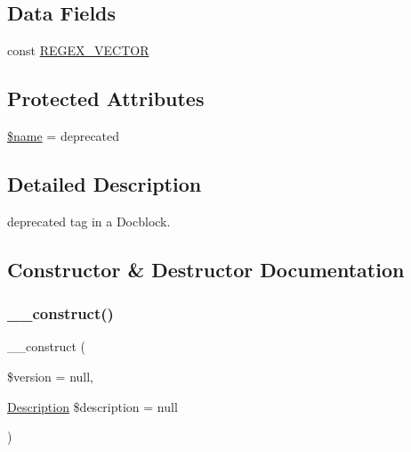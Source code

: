 \subsection*{Data Fields}
\begin{DoxyCompactItemize}
\item 
const \mbox{\hyperlink{classphp_documentor_1_1_reflection_1_1_doc_block_1_1_tags_1_1_deprecated_aec4feb4c31b9abab8a40577d90b872f8}{R\+E\+G\+E\+X\+\_\+\+V\+E\+C\+T\+OR}}
\end{DoxyCompactItemize}
\subsection*{Protected Attributes}
\begin{DoxyCompactItemize}
\item 
\mbox{\hyperlink{classphp_documentor_1_1_reflection_1_1_doc_block_1_1_tags_1_1_deprecated_ab2fc40d43824ea3e1ce5d86dee0d763b}{\$name}} = \textquotesingle{}deprecated\textquotesingle{}
\end{DoxyCompactItemize}


\subsection{Detailed Description}
deprecated tag in a Docblock. 

\subsection{Constructor \& Destructor Documentation}
\mbox{\label{classphp_documentor_1_1_reflection_1_1_doc_block_1_1_tags_1_1_deprecated_a75f67561d733f42ea52230c5b289d264}} 
\subsubsection{\texorpdfstring{\+\_\+\+\_\+construct()}{\_\_construct()}}
{\footnotesize\ttfamily \+\_\+\+\_\+construct (\begin{DoxyParamCaption}\item[{}]{\$version = {\ttfamily null},  }\item[{\mbox{\hyperlink{classphp_documentor_1_1_reflection_1_1_doc_block_1_1_description}{Description}}}]{\$description = {\ttfamily null} }\end{DoxyParamCaption})}



